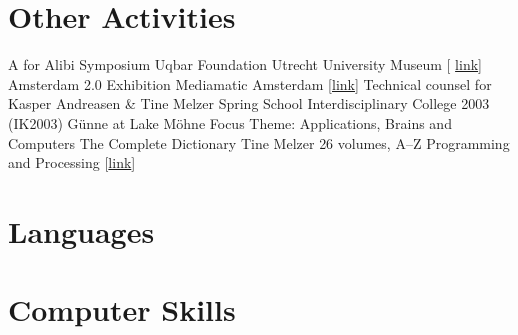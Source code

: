\documentclass[10pt,a4paper,sans]{moderncv}
\begin{document}
\section{Other Activities}
        {A for Alibi Symposium}
        {}
        {Uqbar Foundation}
        {Utrecht University Museum [%
        \href{http://www.sternbergpress.com/?pageId=1204}{link}]}
        {}	
        {Amsterdam 2.0 Exhibition}
        {}
        {Mediamatic}
        {Amsterdam [\href{http://www.mediamatic.net/artefact-9850-en.html}%
        {link}]}
        {Technical counsel for Kasper Andreasen \& Tine Melzer}
        {Spring School}
        {}
        {Interdisciplinary College 2003 (IK2003)}
        {G\"{u}nne at Lake M\"{o}hne}
        {Focus Theme: Applications, Brains and Computers}
        {The Complete Dictionary}
        {}
        {Tine Melzer}
        {26 volumes, A--Z}
        {Programming and Processing
        [\href{http://www.tinemelzer.eu/works/the-complete-dictionary/}
        {link}]}


\section{Languages}


\section{Computer Skills}


\clearpage
\end{document}
